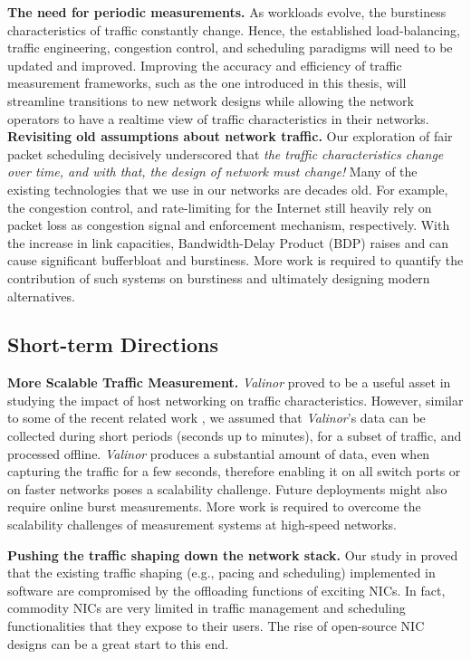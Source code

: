 \textbf{The need for periodic measurements.}
As workloads evolve, the burstiness characteristics of traffic constantly change. Hence, the established load-balancing, traffic engineering, congestion control, and scheduling paradigms will need to be updated and improved.
Improving the accuracy and efficiency of traffic measurement frameworks, such as the one introduced in this thesis, will streamline transitions to new network designs while allowing the network operators to have a realtime view of traffic characteristics in their networks.
\\
\textbf{Revisiting old assumptions about network traffic.}
Our exploration of fair packet scheduling decisively underscored that \emph{the traffic characteristics change over time, and with that, the design of network must change!} Many of the existing technologies that we use in our networks are decades old. For example, the congestion control, and rate-limiting for the Internet still heavily rely on packet loss as congestion signal and enforcement mechanism, respectively. With the increase in link capacities, Bandwidth-Delay Product (BDP) raises and can cause significant bufferbloat \cite{bufferbloat} and burstiness. More work is required to quantify the contribution of such systems on burstiness and ultimately designing modern alternatives.

\subsection{Short-term Directions}

\textbf{More Scalable Traffic Measurement.}
\textit{Valinor} proved to be a useful asset in studying the impact of host networking on traffic characteristics. However, similar to some of the recent related work \cite{milisampler,incast}, we assumed that \textit{Valinor}'s data can be collected during short periods (seconds up to minutes), for a subset of traffic, and processed offline. \textit{Valinor} produces a substantial amount of data, even when capturing the traffic for a few seconds, therefore enabling it on all switch ports or on faster networks poses a scalability challenge. Future deployments might also require online burst measurements. More work is required to overcome the scalability challenges of measurement systems at high-speed networks.

\textbf{Pushing the traffic shaping down the network stack.} Our study in \cite{valinor} proved that the existing traffic shaping (e.g., pacing and scheduling) implemented in software are compromised by the offloading functions of exciting NICs. In fact, commodity NICs are very limited in traffic management and scheduling functionalities that they expose to their users. The rise of open-source NIC designs  \cite{corundum} can be a great start to this end.

